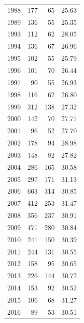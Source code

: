 \documentclass[12pt,]{article}
\begin{document}
\begin{table}[ht]
\begin{tabular}{rrrr}
  1988 & 177 &  65 & 25.63 \\ 
  1989 & 136 &  55 & 25.35 \\ 
  1993 & 112 &  62 & 28.05 \\ 
  1994 & 136 &  67 & 26.96 \\ 
  1995 & 102 &  55 & 25.79 \\ 
  1996 & 101 &  70 & 26.44 \\ 
  1997 &  90 &  55 & 26.93 \\ 
  1998 & 116 &  62 & 26.80 \\ 
  1999 & 312 & 138 & 27.32 \\ 
  2000 & 142 &  70 & 27.77 \\ 
  2001 &  96 &  52 & 27.70 \\ 
  2002 & 178 &  94 & 28.98 \\ 
  2003 & 148 &  82 & 27.82 \\ 
  2004 & 286 & 165 & 30.58 \\ 
  2005 & 297 & 171 & 31.13 \\ 
  2006 & 663 & 314 & 30.85 \\ 
  2007 & 412 & 253 & 31.47 \\ 
  2008 & 356 & 237 & 30.91 \\ 
  2009 & 471 & 280 & 30.84 \\ 
  2010 & 241 & 150 & 30.39 \\ 
  2011 & 244 & 131 & 30.55 \\ 
  2012 & 158 &  95 & 30.65 \\ 
  2013 & 226 & 144 & 30.72 \\ 
  2014 & 153 &  92 & 30.52 \\ 
  2015 & 106 &  68 & 31.27 \\ 
  2016 &  89 &  53 & 30.51 \\ 
   \hline
\end{tabular}
\end{table}

\FloatBarrier
\end{document}
